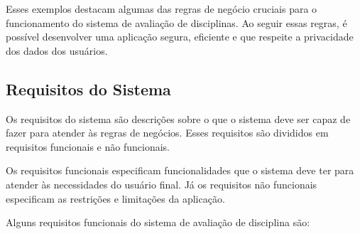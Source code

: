 Esses exemplos destacam algumas das regras de negócio cruciais para o funcionamento do sistema de avaliação de disciplinas. Ao seguir essas regras, é possível desenvolver uma aplicação segura, eficiente e que respeite a privacidade dos dados dos usuários.

\subsection{Requisitos do Sistema}
Os requisitos do sistema são descrições sobre o que o sistema deve ser capaz de fazer para atender às regras de negócios. Esses requisitos são divididos em requisitos funcionais e não funcionais. 

Os requisitos funcionais especificam funcionalidades que o sistema deve ter para atender às necessidades do usuário final. Já os requisitos não funcionais especificam as restrições e limitações da aplicação.

Alguns requisitos funcionais do sistema de avaliação de disciplina são:


